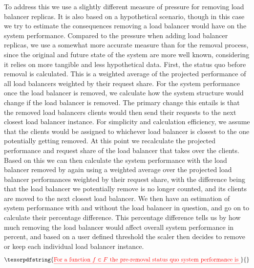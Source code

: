 \documentclass[draft,final]{vutinfth} %
\providecommand{\DIFdeltex}[1]{{\protect\color{red}\sout{#1}}}                      %
\providecommand{\DIFaddbegin}{} %
\providecommand{\DIFdelbegin}{} %
\providecommand{\DIFdelend}{} %
\providecommand{\DIFdel}[1]{\texorpdfstring{\DIFdeltex{#1}}{}} %
\begin{document}
To address this we use a slightly different measure of pressure for removing load balancer replicas.
It is also based on a hypothetical scenario, though in this case we try to estimate the consequences removing a load balancer would have on the system performance.
Compared to the pressure when adding load balancer replicas, we use a somewhat more accurate measure than for the removal process, since the original and future state of the system are more well known, considering it relies on more tangible and less hypothetical data.
First, the status quo before removal is calculated.
This is a weighted average of the projected performance of all load balancers weighted by their request share.
For the system performance once the load balancer is removed, we calculate how the system structure would change if the load balancer is removed.
The primary change this entails is that the removed load balancers clients would then send their requests to the next closest load balancer instance.
For simplicity and calculation efficiency, we assume that the clients would be assigned to whichever load balancer is closest to the one potentially getting removed.
At this point we recalculate the projected performance and request share of the load balancer that takes over the clients.
Based on this we can then calculate the system performance with the load balancer removed by again using a weighted average over the projected load balancer performances weighted by their request share, with the difference being that the load balancer we potentially remove is no longer counted, and its clients are moved to the next closest load balancer.
We then have an estimation of system performance with and without the load balancer in question, and go on to calculate their percentage difference.
This percentage difference tells us by how much removing the load balancer would affect overall system performance in percent, and based on a user defined threshold the scaler then decides to remove or keep each individual load balancer instance.
\DIFdelbegin \[\DIFdel{\text{For a function }f \in F \text{ the pre-removal status quo system performance is }}\]%
\DIFdelend \DIFaddbegin 
\end{document}
